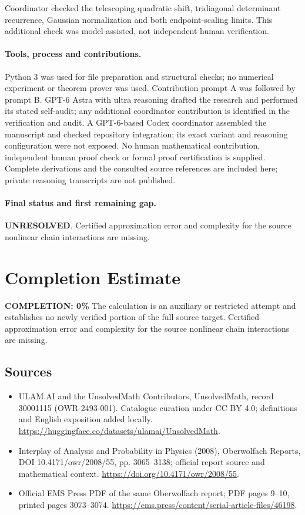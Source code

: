 \documentclass[11pt]{article}
\begin{document}
Coordinator checked the telescoping quadratic shift, tridiagonal determinant recurrence, Gaussian normalization and both endpoint-scaling limits. This additional check was model-assisted, not independent human verification.

\paragraph{Tools, process and contributions.}
Python 3 was used for file preparation and structural checks; no numerical experiment or theorem prover was used. Contribution prompt A was followed by prompt B. GPT-6 Astra with ultra reasoning drafted the research and performed its stated self-audit; any additional coordinator contribution is identified in the verification and audit. A GPT-6-based Codex coordinator assembled the manuscript and checked repository integration; its exact variant and reasoning configuration were not exposed. No human mathematical contribution, independent human proof check or formal proof certification is supplied. Complete derivations and the consulted source references are included here; private reasoning transcripts are not published.

\paragraph{Final status and first remaining gap.}
\textbf{UNRESOLVED}. Certified approximation error and complexity for the source nonlinear chain interactions are missing.

\section{Completion Estimate}
\noindent\textbf{COMPLETION: 0\%}
The calculation is an auxiliary or restricted attempt and establishes no newly verified portion of the full source target. Certified approximation error and complexity for the source nonlinear chain interactions are missing.

\subsection{Sources}
\begin{itemize}
\item[\hypertarget{source:30001115:1}{S1}] ULAM.AI and the UnsolvedMath Contributors, UnsolvedMath, record 30001115 (OWR-2493-001). Catalogue curation under CC BY 4.0; definitions and English exposition added locally.
\url{https://huggingface.co/datasets/ulamai/UnsolvedMath}.
\item[\hypertarget{source:30001115:2}{S2}] Interplay of Analysis and Probability in Physics (2008), Oberwolfach Reports, DOI 10.4171/owr/2008/55, pp. 3065--3138; official report source and mathematical context.
\url{https://doi.org/10.4171/owr/2008/55}.
\item[\hypertarget{source:30001115:3}{S3}] Official EMS Press PDF of the same Oberwolfach report; PDF pages 9--10, printed pages 3073--3074.
\url{https://ems.press/content/serial-article-files/46198}.
\end{itemize}
\label{end:30001115}
\end{document}
